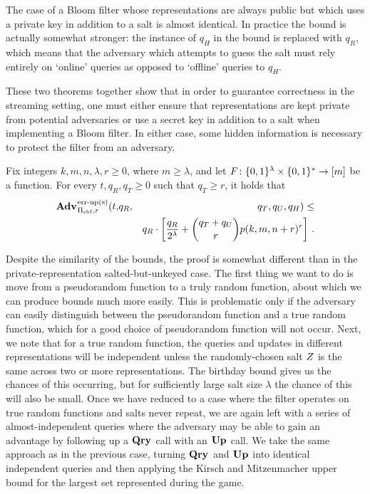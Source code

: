 The case of a Bloom filter whose representations are always public but which uses a private key in addition to a salt is almost identical. In practice the bound is actually somewhat stronger: the instance of $q_H$ in the bound is replaced with $q_R$, which means that the adversary which attempts to guess the salt must rely entirely on `online' queries as opposed to `offline' queries to $q_H$.

These two theorems together show that in order to guarantee correctness in the streaming setting, one must either ensure that representations are kept private from potential adversaries or use a secret key in addition to a salt when implementing a Bloom filter. In either case, some hidden information is necessary to protect the filter from an adversary.

\begin{theorem}\label{thm:bf-key-bound}
Fix integers $k, m, n, \lambda, r\geq 0$, where $m \geq \lambda$, and let $F \colon \{0,1\}^\lambda \times \{0,1\}^* \to [m]$ be a function.
  For every $t, q_R, q_T \geq 0$ such that $q_T \geq r$, it holds that
  \begin{eqnarray*}
    \Adv{\erreps}_{\struct_\saltybloom,r}(t,&q_R,& q_T, q_U, q_H) \leq \\ && q_R \cdot
     \left[
      \frac{q_R}{2^\lambda} +
      {\dbinom{q_T+q_U}{r}} p(k, m, n+r)^r
    \right] \,.
\end{eqnarray*}
\end{theorem}

Despite the similarity of the bounds, the proof is somewhat different than in the private-representation salted-but-unkeyed case. The first thing we want to do is move from a pseudorandom function to a truly random function, about which we can produce bounds much more easily. This is problematic only if the adversary can easily distinguish between the pseudorandom function and a true random function, which for a good choice of pseudorandom function will not occur. Next, we note that for a true random function, the queries and updates in different representations will be independent unless the randomly-chosen salt $Z$ is the same across two or more representations. The birthday bound gives us the chances of this occurring, but for sufficiently large salt size $\lambda$ the chance of this will also be small. Once we have reduced to a case where the filter operates on true random functions and salts never repeat, we are again left with a series of almost-independent queries where the adversary may be able to gain an advantage by following up a $\mathbf{Qry}\hspace{0.5pt}$ call with an $\mathbf{Up}\hspace{0.5pt}$ call. We take the same approach as in the previous case, turning $\mathbf{Qry}\hspace{0.5pt}$ and $\mathbf{Up}\hspace{0.5pt}$ into identical independent queries and then applying the Kirsch and Mitzenmacher upper bound for the largest set represented during the game.

